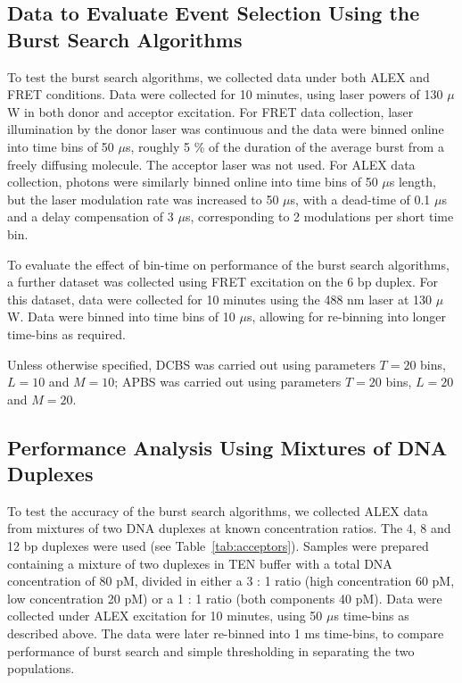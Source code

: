 \subsection{Data to Evaluate Event Selection Using the Burst Search Algorithms}
To test the burst search algorithms, we collected data under both ALEX and FRET conditions. Data were collected for 10 minutes, using laser powers of 130 $\mu$W in both donor and acceptor excitation. For FRET data collection, laser illumination by the donor laser was continuous and the data were binned online into time bins of 50 $\mu$s, roughly 5 \% of the duration of the average burst from a freely diffusing molecule. The acceptor laser was not used. For ALEX data collection, photons were similarly binned online into time bins of 50 $\mu$s length, but the laser modulation rate was increased to 50 $\mu$s, with a dead-time of 0.1 $\mu$s and a delay compensation of 3 $\mu$s, corresponding to 2 modulations per short time bin. 

To evaluate the effect of bin-time on performance of the burst search algorithms, a further dataset was collected using FRET excitation on the 6 bp duplex. For this dataset, data were collected for 10 minutes using the 488 nm laser at 130 $\mu$W. Data were binned into time bins of 10 $\mu$s, allowing for re-binning into longer time-bins as required.

Unless otherwise specified, DCBS was carried out using parameters $T = 20$ bins, $L = 10$ and $M = 10$; APBS was carried out using parameters $T = 20$ bins, $L = 20$ and $M = 20$.

\subsection{Performance Analysis Using Mixtures of DNA Duplexes}
To test the accuracy of the burst search algorithms, we collected ALEX data from mixtures of two DNA duplexes at known concentration ratios. The 4, 8 and 12 bp duplexes were used (see Table~\ref{tab:acceptors}). Samples were prepared containing a mixture of two duplexes in TEN buffer with a total DNA concentration of 80 pM, divided in either a 3 : 1 ratio (high concentration 60 pM, low concentration 20 pM) or a 1 : 1 ratio (both components 40 pM). Data were collected under ALEX excitation for 10 minutes, using 50 $\mu$s time-bins as described above. The data were later re-binned into 1 ms time-bins, to compare performance of burst search and simple thresholding in separating the two populations.  


